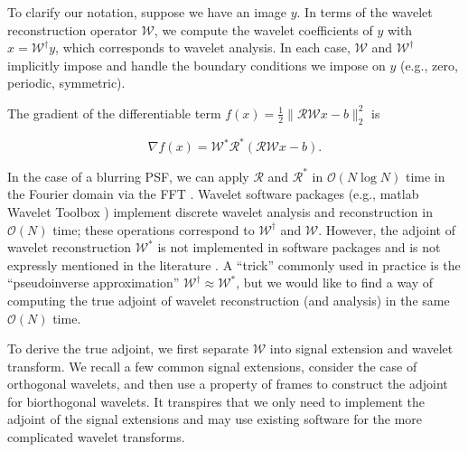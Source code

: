 \documentclass[journal]{IEEEtran}
\begin{document}
To clarify our notation, suppose we have an image $y$.  In terms of the wavelet reconstruction operator $\mathcal{W}$, we compute the wavelet coefficients of $y$ with $x=\mathcal{W}^\dagger y$, which corresponds to wavelet analysis.  In each case, $\mathcal{W}$ and $\mathcal{W}^\dagger$ implicitly impose and handle the boundary conditions we impose on $y$ (e.g., zero, periodic, symmetric).

The gradient of the differentiable term $f(x)={\frac{1}{2}\|\mathcal{RW}x-b\|_2^2}$ is

\[ \nabla f(x) = \mathcal{W}^\ast \mathcal{R}^\ast(\mathcal{RW}x-b). \] 

\noindent In the case of a blurring PSF, we can apply $\mathcal{R}$ and $\mathcal{R}^\ast$ in $\mathcal{O}(N\log N)$ time in the Fourier domain via the FFT \cite{beck_2009, hansen_2006}.  Wavelet software packages (e.g., {\sc matlab} Wavelet Toolbox \cite{matlab_wt_2015}) implement discrete wavelet analysis and reconstruction in $\mathcal{O}(N)$ time; these operations correspond to $\mathcal{W}^\dagger$ and $\mathcal{W}$.  However, the adjoint of wavelet reconstruction $\mathcal{W}^\ast$ is not implemented in software packages and is not expressly mentioned in the literature \cite{mallat_2009, daubechies_1992, strang_1996}.  A ``trick'' commonly used in practice is the ``pseudoinverse approximation'' $\mathcal{W}^\dagger\approx\mathcal{W}^\ast$, but we would like to find a way of computing the true adjoint of wavelet reconstruction (and analysis) in the same $\mathcal{O}(N)$ time. 



To derive the true adjoint, we first separate $\mathcal{W}$ into signal extension and wavelet transform.  We recall a few common signal extensions, consider the case of orthogonal wavelets, and then use a property of frames to construct the adjoint for biorthogonal wavelets.  It transpires that we only need to implement the adjoint of the signal extensions and may use existing software for the more complicated wavelet transforms.
\end{document}
